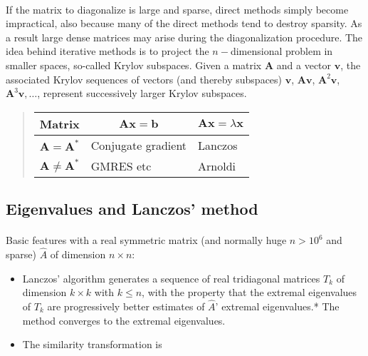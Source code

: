 \documentclass[%
oneside,                 %
final,                   %
10pt]{article}
\begin{document}
\paragraph{}
If the matrix to diagonalize is large and sparse, direct methods simply become impractical, 
also because
many of the direct methods tend to destroy sparsity. As a result large dense matrices may arise during the diagonalization procedure.  The idea behind iterative methods is to project the 
$n-$dimensional problem in smaller spaces, so-called Krylov subspaces. 
Given a matrix $\mathbf{A}$ and a vector $\mathbf{v}$, the associated Krylov sequences of vectors
(and thereby subspaces) 
$\mathbf{v}$, $\mathbf{A}\mathbf{v}$, $\mathbf{A}^2\mathbf{v}$, $\mathbf{A}^3\mathbf{v},\dots$, represent
successively larger Krylov subspaces. 


\begin{quote}
\begin{tabular}{lll}
\hline
\multicolumn{1}{c}{ Matrix } & \multicolumn{1}{c}{ $\mathbf{A}\mathbf{x}=\mathbf{b}$ } & \multicolumn{1}{c}{ $\mathbf{A}\mathbf{x}=\lambda\mathbf{x}$ } \\
\hline
$\mathbf{A}=\mathbf{A}^*$    & Conjugate gradient                & Lanczos                                  \\
$\mathbf{A}\ne \mathbf{A}^*$ & GMRES etc                         & Arnoldi                                  \\
\hline
\end{tabular}
\end{quote}

\noindent



\subsection*{Eigenvalues and Lanczos' method}

\paragraph{}
Basic features with a real symmetric matrix (and normally huge $n> 10^6$ and sparse) 
$\hat{A}$ of dimension $n\times n$:

\begin{itemize}
\item Lanczos' algorithm generates a sequence of real tridiagonal matrices $T_k$ of dimension $k\times k$ with $k\le n$, with the property that the extremal eigenvalues of $T_k$ are progressively better estimates of $\hat{A}$' extremal eigenvalues.* The method converges to the extremal eigenvalues.

\item The similarity transformation is 
\end{itemize}
\end{document}
